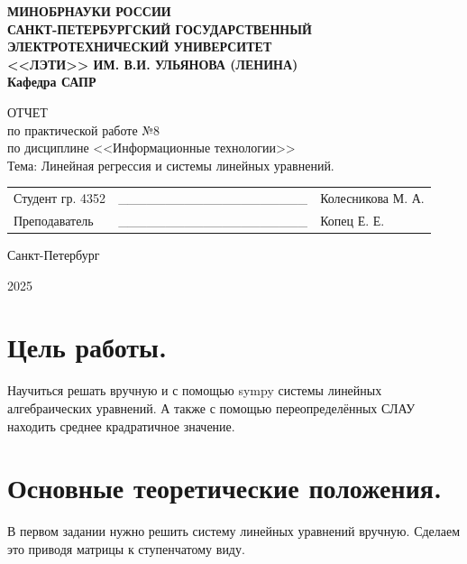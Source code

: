 \documentclass[14pt,a4paper]{extarticle}
\begin{document}
\begin{titlepage}
    \begin{center}
    {\bfseries
    МИНОБРНАУКИ РОССИИ \\ САНКТ-ПЕТЕРБУРГСКИЙ ГОСУДАРСТВЕННЫЙ \\ ЭЛЕКТРОТЕХНИЧЕСКИЙ УНИВЕРСИТЕТ \\ <<ЛЭТИ>> ИМ. В.И. УЛЬЯНОВА (ЛЕНИНА)\\Кафедра САПР \vspace{0.23\textheight}
    
    ОТЧЕТ \\ по практической работе №8 \\ по дисциплине <<Информационные технологии>> \\ Тема: Линейная регрессия и системы линейных уравнений. \\
    \vspace{0.28\textheight}
        }
        \begin{table}[h!]
            \begin{tabularx}{\textwidth}{p{60mm}X>{\centering\arraybackslash}p{45mm}}
                Студент гр. 4352 & \_\_\_\_\_\_\_\_\_\_\_\_\_\_\_\_\_\_\_\_ & {Колесникова М. А.} \\ [5.4mm]  
                Преподаватель    & \_\_\_\_\_\_\_\_\_\_\_\_\_\_\_\_\_\_\_\_ & {Копец Е. Е.} \\ [5.4mm]
            \end{tabularx}
        \end{table}
    Санкт-Петербург\par
        2025
    \end{center}
\end{titlepage}
\setcounter{page}{2}

\section*{Цель работы.}

Научиться решать вручную и с помощью sympy системы линейных алгебраических уравнений.
А также с помощью переопределённых СЛАУ находить среднее крадратичное значение. 

\section*{Основные теоретические положения.}

В первом задании нужно решить систему линейных уравнений вручную.
Сделаем это приводя матрицы к ступенчатому виду.
\end{document}
